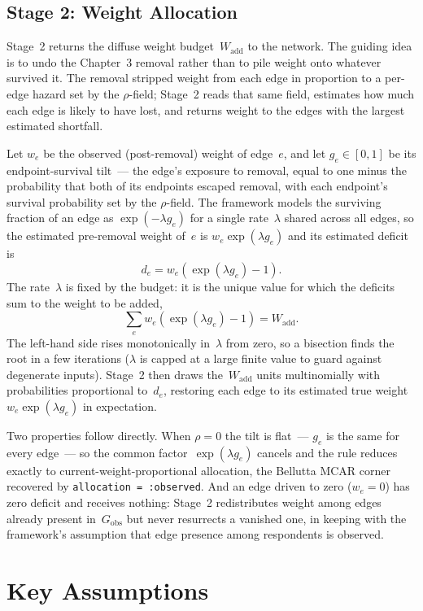 \documentclass[11pt]{article}
\newcommand{\Gobs}{G_{\text{obs}}}
\newcommand{\Wadd}{W_{\text{add}}}
\begin{document}
\subsection{Stage 2: Weight Allocation}

Stage~2 returns the diffuse weight budget~$\Wadd$ to the network. The guiding idea is to undo the Chapter~3 removal rather than to pile weight onto whatever survived it. The removal stripped weight from each edge in proportion to a per-edge hazard set by the $\rho$-field; Stage~2 reads that same field, estimates how much each edge is likely to have lost, and returns weight to the edges with the largest estimated shortfall.

Let $w_e$ be the observed (post-removal) weight of edge~$e$, and let $g_e \in [0, 1]$ be its endpoint-survival tilt~--- the edge's exposure to removal, equal to one minus the probability that both of its endpoints escaped removal, with each endpoint's survival probability set by the $\rho$-field. The framework models the surviving fraction of an edge as $\exp(-\lambda g_e)$ for a single rate~$\lambda$ shared across all edges, so the estimated pre-removal weight of~$e$ is $w_e \exp(\lambda g_e)$ and its estimated deficit is
\[
  d_e = w_e \left( \exp(\lambda g_e) - 1 \right).
\]
The rate~$\lambda$ is fixed by the budget: it is the unique value for which the deficits sum to the weight to be added,
\[
  \sum_e w_e \left( \exp(\lambda g_e) - 1 \right) = \Wadd .
\]
The left-hand side rises monotonically in~$\lambda$ from zero, so a bisection finds the root in a few iterations ($\lambda$ is capped at a large finite value to guard against degenerate inputs). Stage~2 then draws the~$\Wadd$ units multinomially with probabilities proportional to~$d_e$, restoring each edge to its estimated true weight~$w_e \exp(\lambda g_e)$ in expectation.

Two properties follow directly. When $\rho = 0$ the tilt is flat~--- $g_e$ is the same for every edge~--- so the common factor~$\exp(\lambda g_e)$ cancels and the rule reduces exactly to current-weight-proportional allocation, the Bellutta MCAR corner recovered by \texttt{allocation = :observed}. And an edge driven to zero ($w_e = 0$) has zero deficit and receives nothing: Stage~2 redistributes weight among edges already present in~$\Gobs$ but never resurrects a vanished one, in keeping with the framework's assumption that edge presence among respondents is observed.

\section{Key Assumptions}
\end{document}
